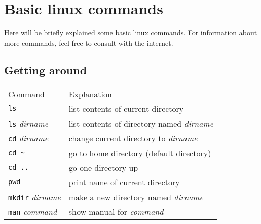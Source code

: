 \section{Basic linux commands}
Here will be briefly explained some basic linux commands.
For information about more commands, feel free to consult with the internet.

\subsection{Getting around}
\begin{tabular}{ll}
  Command & Explanation \\
  \hhline{==}
  \texttt{ls} & list contents of current directory \\
  \texttt{ls} \textit{dirname} & list contents of directory named \textit{dirname} \\
  \texttt{cd} \textit{dirname} & change current directory to \textit{dirname} \\
  \texttt{cd \textasciitilde} & go to home directory (default directory) \\
  \texttt{cd ..} & go one directory up \\
  \texttt{pwd} & print name of current directory \\
  \texttt{mkdir} \textit{dirname} & make a new directory named \textit{dirname}\\
  \texttt{man} \textit{command} & show manual for \textit{command} \\
\end{tabular}

